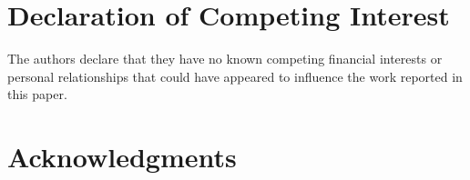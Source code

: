 \documentclass[preprint,12pt]{elsarticle}
\begin{document}
\section{Declaration of Competing Interest}
The authors declare that they have no known competing financial interests or personal relationships that could have appeared to influence the work reported in this paper.
\section{Acknowledgments}

  
 





\end{document}
